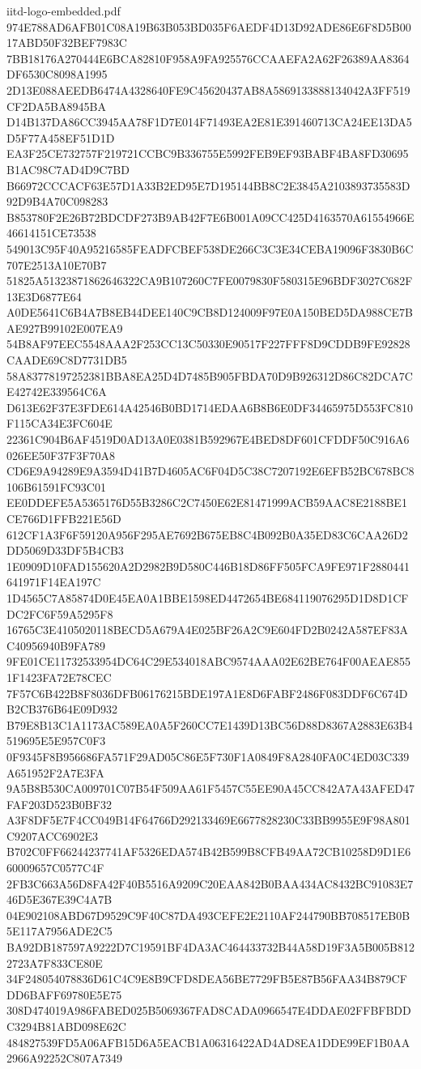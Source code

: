 \begin{filecontents*}[overwrite]{iitd-logo-embedded.pdf}
974E788AD6AFB01C08A19B63B053BD035F6AEDF4D13D92ADE86E6F8D5B0017ABD50F32BEF7983C
7BB18176A270444E6BCA82810F958A9FA925576CCAAEFA2A62F26389AA8364DF6530C8098A1995
2D13E088AEEDB6474A4328640FE9C45620437AB8A5869133888134042A3FF519CF2DA5BA8945BA
D14B137DA86CC3945AA78F1D7E014F71493EA2E81E391460713CA24EE13DA5D5F77A458EF51D1D
EA3F25CE732757F219721CCBC9B336755E5992FEB9EF93BABF4BA8FD30695B1AC98C7AD4D9C7BD
B66972CCCACF63E57D1A33B2ED95E7D195144BB8C2E3845A2103893735583D92D9B4A70C098283
B853780F2E26B72BDCDF273B9AB42F7E6B001A09CC425D4163570A61554966E46614151CE73538
549013C95F40A95216585FEADFCBEF538DE266C3C3E34CEBA19096F3830B6C707E2513A10E70B7
51825A51323871862646322CA9B107260C7FE0079830F580315E96BDF3027C682F13E3D6877E64
A0DE5641C6B4A7B8EB44DEE140C9CB8D124009F97E0A150BED5DA988CE7BAE927B99102E007EA9
54B8AF97EEC5548AAA2F253CC13C50330E90517F227FFF8D9CDDB9FE92828CAADE69C8D7731DB5
58A83778197252381BBA8EA25D4D7485B905FBDA70D9B926312D86C82DCA7CE42742E339564C6A
D613E62F37E3FDE614A42546B0BD1714EDAA6B8B6E0DF34465975D553FC810F115CA34E3FC604E
22361C904B6AF4519D0AD13A0E0381B592967E4BED8DF601CFDDF50C916A6026EE50F37F3F70A8
CD6E9A94289E9A3594D41B7D4605AC6F04D5C38C7207192E6EFB52BC678BC8106B61591FC93C01
EE0DDEFE5A5365176D55B3286C2C7450E62E81471999ACB59AAC8E2188BE1CE766D1FFB221E56D
612CF1A3F6F59120A956F295AE7692B675EB8C4B092B0A35ED83C6CAA26D2DD5069D33DF5B4CB3
1E0909D10FAD155620A2D2982B9D580C446B18D86FF505FCA9FE971F2880441641971F14EA197C
1D4565C7A85874D0E45EA0A1BBE1598ED4472654BE684119076295D1D8D1CFDC2FC6F59A5295F8
16765C3E4105020118BECD5A679A4E025BF26A2C9E604FD2B0242A587EF83AC40956940B9FA789
9FE01CE11732533954DC64C29E534018ABC9574AAA02E62BE764F00AEAE8551F1423FA72E78CEC
7F57C6B422B8F8036DFB06176215BDE197A1E8D6FABF2486F083DDF6C674DB2CB376B64E09D932
B79E8B13C1A1173AC589EA0A5F260CC7E1439D13BC56D88D8367A2883E63B4519695E5E957C0F3
0F9345F8B956686FA571F29AD05C86E5F730F1A0849F8A2840FA0C4ED03C339A651952F2A7E3FA
9A5B8B530CA009701C07B54F509AA61F5457C55EE90A45CC842A7A43AFED47FAF203D523B0BF32
A3F8DF5E7F4CC049B14F64766D292133469E6677828230C33BB9955E9F98A801C9207ACC6902E3
B702C0FF66244237741AF5326EDA574B42B599B8CFB49AA72CB10258D9D1E660009657C0577C4F
2FB3C663A56D8FA42F40B5516A9209C20EAA842B0BAA434AC8432BC91083E746D5E367E39C4A7B
04E902108ABD67D9529C9F40C87DA493CEFE2E2110AF244790BB708517EB0B5E117A7956ADE2C5
BA92DB187597A9222D7C19591BF4DA3AC464433732B44A58D19F3A5B005B8122723A7F833CE80E
34F248054078836D61C4C9E8B9CFD8DEA56BE7729FB5E87B56FAA34B879CFDD6BAFF69780E5E75
308D474019A986FABED025B5069367FAD8CADA0966547E4DDAE02FFBFBDDC3294B81ABD098E62C
484827539FD5A06AFB15D6A5EACB1A06316422AD4AD8EA1DDE99EF1B0AA2966A92252C807A7349

\end{filecontents*}
